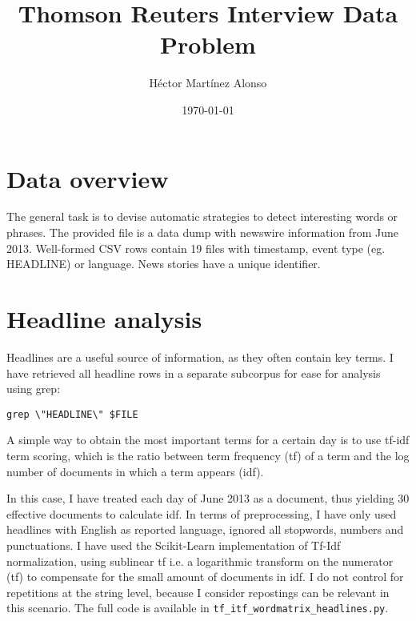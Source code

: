 \documentclass[12pt]{article}%
\begin{document}
\title{Thomson Reuters Interview Data Problem}
\author{Héctor Martínez Alonso}
\date{\today}
\maketitle
\section{Data overview}

The general task is to devise automatic strategies to detect interesting words or phrases.
The provided file is a data dump with newswire information from  June 2013. Well-formed CSV rows contain 19 files with timestamp, event type (eg. HEADLINE) or language. News stories have a unique identifier. 

\section{Headline analysis}

Headlines are a useful source of information, as they often contain key terms. I have retrieved all headline rows in a separate subcorpus for ease for analysis using grep:
{\small
\begin{verbatim}
grep \"HEADLINE\" $FILE
\end{verbatim}}

A simple way to obtain the most important terms for a certain day is to use tf-idf term scoring, which is the ratio between term frequency (tf) of a term and the log number of documents in which a term appears (idf). 

In this case, I have treated each day of June 2013 as a document, thus yielding 30 effective documents to calculate idf. In terms of preprocessing, I have only used headlines with English as reported language, ignored all stopwords, numbers and punctuations. I have used the Scikit-Learn implementation of Tf-Idf normalization, using sublinear tf i.e. a logarithmic transform on the numerator (tf) to compensate for the small amount of documents in idf. I do not control for repetitions at the string level, because I consider repostings can be relevant in this scenario. The full code is available in \texttt{tf\_itf\_wordmatrix\_headlines.py}.
\end{document}

